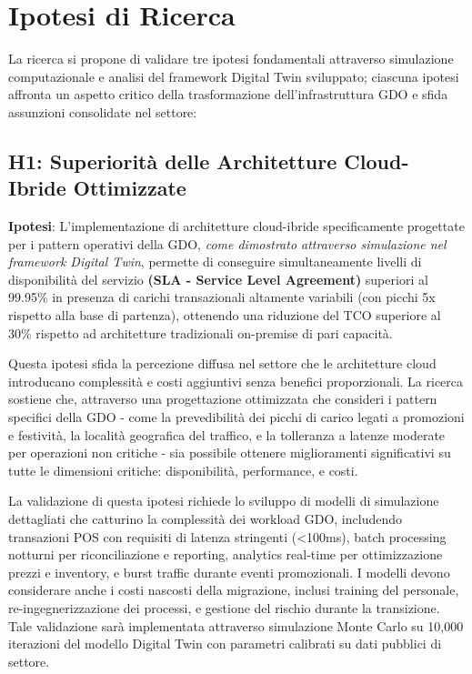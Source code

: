 \section{Ipotesi di Ricerca}

La ricerca si propone di validare tre ipotesi fondamentali attraverso 
simulazione computazionale e analisi del framework Digital Twin sviluppato; ciascuna ipotesi affronta un aspetto critico della trasformazione dell'infrastruttura GDO e sfida assunzioni consolidate nel settore:

\subsection{H1: Superiorità delle Architetture Cloud-Ibride Ottimizzate}

\textbf{Ipotesi}: L'implementazione di architetture cloud-ibride specificamente progettate per i pattern operativi della GDO, \textit{come dimostrato attraverso 
simulazione nel framework Digital Twin}, permette di conseguire simultaneamente livelli di disponibilità del servizio \textbf{(SLA - Service Level Agreement)} superiori al 99.95\% in presenza di carichi transazionali altamente variabili (con picchi 5x rispetto alla base di partenza), ottenendo una riduzione del TCO superiore al 30\% rispetto ad architetture tradizionali on-premise di pari capacità.

Questa ipotesi sfida la percezione diffusa nel settore che le architetture cloud introducano complessità e costi aggiuntivi senza benefici proporzionali. La ricerca sostiene che, attraverso una progettazione ottimizzata che consideri i pattern specifici della GDO - come la prevedibilità dei picchi di carico legati a promozioni e festività, la località geografica del traffico, e la tolleranza a latenze moderate per operazioni non critiche - sia possibile ottenere miglioramenti significativi su tutte le dimensioni critiche: disponibilità, performance, e costi.

La validazione di questa ipotesi richiede lo sviluppo di modelli di simulazione dettagliati che catturino la complessità dei workload GDO, includendo transazioni POS con requisiti di latenza stringenti (<100ms), batch processing notturni per riconciliazione e reporting, analytics real-time per ottimizzazione prezzi e inventory, e burst traffic durante eventi promozionali. I modelli devono considerare anche i costi nascosti della migrazione, inclusi training del personale, re-ingegnerizzazione dei processi, e gestione del rischio durante la transizione. Tale validazione sarà implementata attraverso simulazione Monte Carlo su 10,000 iterazioni del modello Digital Twin con parametri calibrati su dati pubblici di settore.

